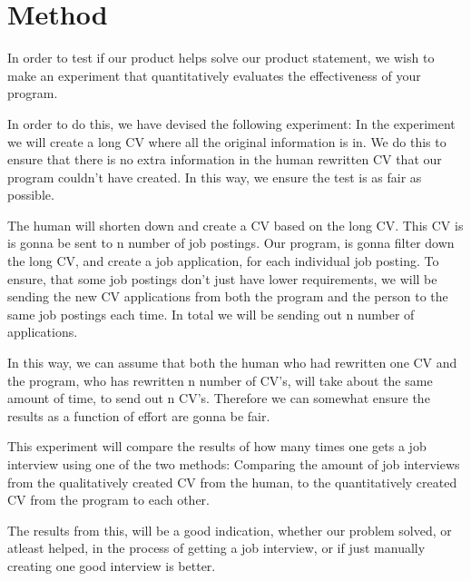 \section{Method}\label{sec:method}
In order to test if our product helps solve our product statement, we wish
to make an experiment that quantitatively evaluates the effectiveness of your
program. 

In order to do this, we have devised the following experiment:
In the experiment we will create a long CV where all the original information
is in. We do this to ensure that there is no extra information in the human 
rewritten CV that our program couldn't have created. In this way, we ensure
the test is as fair as possible. 

The human will shorten down and create a CV based on the long CV. This CV is
is gonna be sent to n number of job postings.
Our program, is gonna filter down the long CV, and create a job application,
for each individual job posting. 
To ensure, that some job postings don't just have lower requirements, we will be
sending the new CV applications from both the program and the person to the same 
job postings each time. In total we will be sending out n number of applications.

In this way, we can assume that both the human who had rewritten one
CV and the program, who has rewritten n number of CV's,
will take about the same amount of time, to send out n CV's.
Therefore we can somewhat ensure the results as a function of effort are gonna
be fair.

This experiment will compare the results of how many times one gets a job
interview using one of the two methods: Comparing the amount of 
job interviews from the qualitatively created CV from
the human, to the quantitatively created CV from the program to
each other.

The results from this, will be a good indication, whether our problem solved, or
atleast helped, in the process of getting a job interview, or if just manually
creating one good interview is better.
